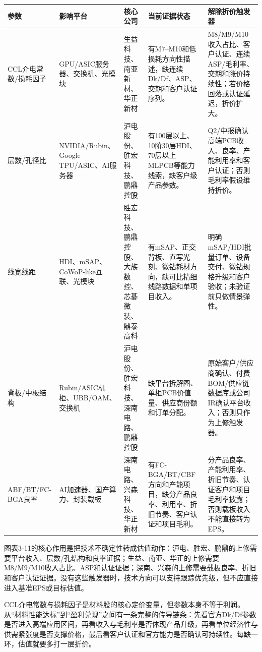 \begin{exhibitbox}[图表3-11：未披露工程参数与估值影响]
\footnotesize
\begin{tabularx}{\textwidth}{L{2.2cm}L{2.2cm}X X X}
\toprule
\textbf{参数} & \textbf{影响平台} & \textbf{核心公司} & \textbf{当前证据状态} & \textbf{解除折价触发器} \\
\midrule
CCL介电常数/损耗因子 & GPU/ASIC服务器、交换机、光模块 & 生益科技、南亚新材、华正新材 & 有M7--M10和低损耗方向性描述，缺连续Dk/Df、ASP、交期和客户认证序列。 & M8/M9/M10收入占比、客户认证、连续ASP/毛利率、交期和涨价持续性；若价格回落或认证延迟，折价扩大。 \\
层数/孔径比 & NVIDIA/Rubin、Google TPU/ASIC、AI服务器 & 沪电股份、胜宏科技、鹏鼎控股 & 有100层以上、10阶30层HDI、70层以上MLPCB等能力线索，缺客户级产品参数。 & Q2/中报确认高端PCB收入、良率、产能利用率和客户认证；否则毛利率假设维持折价。 \\
线宽线距 & HDI、mSAP、CoWoP-like互联、光模块 & 胜宏科技、鹏鼎控股、大族数控、芯碁微装、鼎泰高科 & 有mSAP、正交背板、直写光刻、微钻耗材方向，缺可比精细线路数据和单项目收入。 & 明确mSAP/HDI批量订单、设备交付、微钻规格升级和客户验收；未验证前只做情景弹性。 \\
背板/中板结构 & Rubin/ASIC机柜、UBB/OAM、交换机 & 沪电股份、胜宏科技、深南电路、鹏鼎控股 & 缺平台拆解图、单柜PCB价值量、供应商份额和订单分配。 & 原始客户/供应商确认、付费BOM/供应链数据库或公司IR确认平台收入；否则只作为上修触发器。 \\
ABF/BT/FC-BGA良率 & AI加速器、国产算力、封装载板 & 深南电路、兴森科技、华正新材 & 有FC-BGA/BT/CBF方向和产能项目，缺分产品良率、利用率、折旧节奏、客户认证和项目毛利。 & 分产品良率、产能利用率、折旧节奏、认证客户和项目毛利率披露；否则载板收入不能直接转为EPS。 \\
\bottomrule
\end{tabularx}
\end{exhibitbox}

图表3-11的核心作用是把技术不确定性转成估值动作：沪电、胜宏、鹏鼎的上修需要平台收入、层数/孔结构和良率证据；生益、南亚、华正的上修需要M8/M9/M10收入占比、ASP和认证证据；深南、兴森的上修需要载板良率、折旧和客户认证证据。没有这些触发器时，技术方向可以支持跟踪优先级，但不应直接进入基准EPS或目标估值。

CCL介电常数与损耗因子是材料股的核心定价变量，但参数本身不等于利润。从“材料性能达标”到“盈利兑现”之间有一条完整的传导链条：先看官方Dk/Df参数是否进入高端应用区间，再看收入与毛利率是否体现产品升级，再看单位经济性与供需紧张度是否支撑价格，最后看客户认证和官方能力是否确认可持续性。每缺一环，估值就要多打一层折价。

